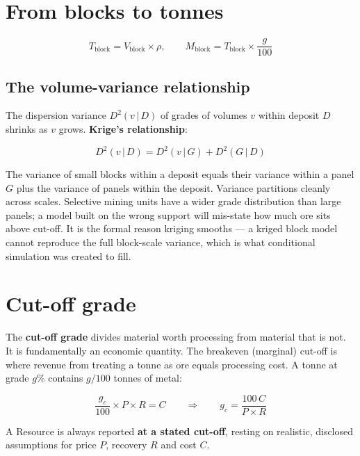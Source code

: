 \documentclass[11pt]{article}
\begin{document}
\section{From blocks to tonnes}

\begin{eqbox}
\[ T_{\text{block}}=V_{\text{block}}\times\rho,
   \qquad
   M_{\text{block}}=T_{\text{block}}\times\frac{g}{100} \tag{6.1}\]
\end{eqbox}

\subsection*{The volume-variance relationship}

The dispersion variance $D^2(v\,|\,D)$ of grades of volumes $v$ within
deposit $D$ shrinks as $v$ grows. \textbf{Krige's relationship}:

\begin{eqbox}
\[ D^{2}(v\,|\,D) = D^{2}(v\,|\,G) + D^{2}(G\,|\,D) \tag{6.2}\]
\end{eqbox}

The variance of small blocks within a deposit equals their variance
within a panel $G$ plus the variance of panels within the deposit.
Variance partitions cleanly across scales. Selective mining units have a
wider grade distribution than large panels; a model built on the wrong
support will mis-state how much ore sits above cut-off. It is the formal
reason kriging smooths --- a kriged block model cannot reproduce the full
block-scale variance, which is what conditional simulation was created
to fill.

\section{Cut-off grade}

The \textbf{cut-off grade} divides material worth processing from
material that is not. It is fundamentally an economic quantity. The
breakeven (marginal) cut-off is where revenue from treating a tonne as
ore equals processing cost. A tonne at grade $g\%$ contains $g/100$
tonnes of metal:

\begin{eqbox}
\[ \frac{g_c}{100}\times P\times R = C
   \qquad\Longrightarrow\qquad
   g_c = \frac{100\,C}{P\times R} \tag{6.3}\]
\end{eqbox}

A Resource is always reported \textbf{at a stated cut-off}, resting on
realistic, disclosed assumptions for price $P$, recovery $R$ and cost
$C$.
\end{document}
